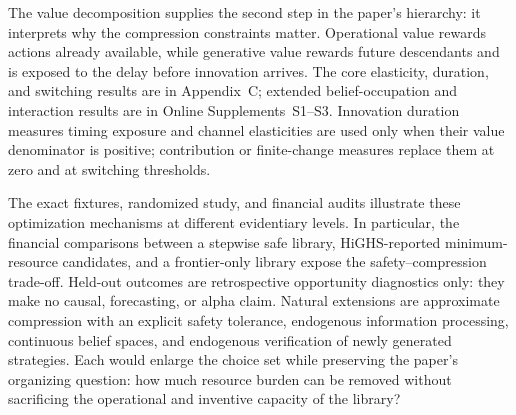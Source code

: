The value decomposition supplies the second step in the paper's hierarchy:
it interprets why the compression constraints matter.  Operational value
rewards actions already available, while generative value rewards future
descendants and is exposed to the delay before innovation arrives.  The
core elasticity, duration, and switching results are in Appendix~C; extended
belief-occupation and interaction results are in Online Supplements~S1--S3.
Innovation duration measures timing exposure and channel elasticities are used
only when their value denominator is positive; contribution or finite-change
measures replace them at zero and at switching thresholds.

The exact fixtures, randomized study, and financial audits illustrate these
optimization mechanisms at different evidentiary levels. In particular, the
financial comparisons between a stepwise safe library, HiGHS-reported
minimum-resource candidates, and a frontier-only library expose the
safety--compression trade-off. Held-out outcomes are retrospective opportunity
diagnostics only: they make no causal, forecasting, or alpha claim. Natural
extensions are approximate compression with an explicit safety tolerance,
endogenous information processing, continuous belief spaces, and endogenous
verification of newly generated strategies. Each would enlarge the choice set
while preserving the paper's organizing question: how much resource burden
can be removed without sacrificing the operational and inventive capacity of
the library?
\clearpage
